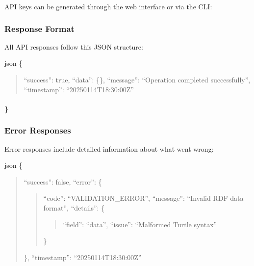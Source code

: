 \documentclass[letterpaper,10pt,english]{sphinxmanual}
\begin{document}
\sphinxAtStartPar
{}

\sphinxAtStartPar
API keys can be generated through the web interface or via the CLI:

\sphinxAtStartPar
{}


\subsubsection{Response Format}
\label{\detokenize{api/rest-api:response-format}}
\sphinxAtStartPar
All API responses follow this JSON structure:

\sphinxAtStartPar
{\color{red}\bfseries{}\textasciigrave{}\textasciigrave{}}{\color{red}\bfseries{}\textasciigrave{}}json
\{
\begin{quote}

\sphinxAtStartPar
“success”: true,
“data”: \{\},
“message”: “Operation completed successfully”,
“timestamp”: “2025\sphinxhyphen{}01\sphinxhyphen{}14T18:30:00Z”
\end{quote}


\paragraph{\}}
\label{\detokenize{api/rest-api:id5}}

\subsubsection{Error Responses}
\label{\detokenize{api/rest-api:error-responses}}
\sphinxAtStartPar
Error responses include detailed information about what went wrong:

\sphinxAtStartPar
{\color{red}\bfseries{}\textasciigrave{}\textasciigrave{}}{\color{red}\bfseries{}\textasciigrave{}}json
\{
\begin{quote}

\sphinxAtStartPar
“success”: false,
“error”: \{
\begin{quote}

\sphinxAtStartPar
“code”: “VALIDATION\_ERROR”,
“message”: “Invalid RDF data format”,
“details”: \{
\begin{quote}

\sphinxAtStartPar
“field”: “data”,
“issue”: “Malformed Turtle syntax”
\end{quote}

\sphinxAtStartPar
\}
\end{quote}

\sphinxAtStartPar
\},
“timestamp”: “2025\sphinxhyphen{}01\sphinxhyphen{}14T18:30:00Z”
\end{quote}
\end{document}
